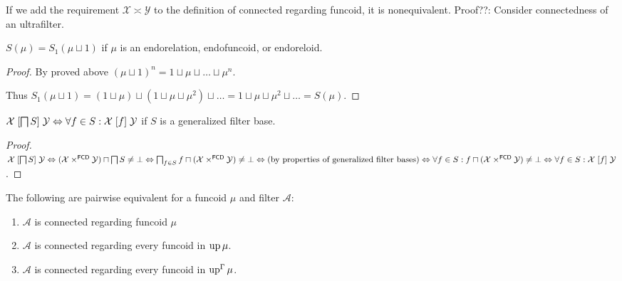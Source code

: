 If we add the requirement $\mathcal{X} \asymp \mathcal{Y}$ to the definition
of connected regarding funcoid, it is nonequivalent. Proof??: Consider
connectedness of an ultrafilter.

\begin{prop}
  $S (\mu) = S_1 (\mu \sqcup 1)$ if $\mu$ is an endorelation, endofuncoid, or
  endoreloid. 
\end{prop}

\begin{proof}
  By proved above $(\mu \sqcup 1)^n = 1 \sqcup \mu \sqcup \ldots \sqcup
  \mu^n$.

  Thus $S_1 (\mu \sqcup 1) = (1 \sqcup \mu) \sqcup (1 \sqcup \mu \sqcup \mu^2)
  \sqcup \ldots = 1 \sqcup \mu \sqcup \mu^2 \sqcup \ldots = S (\mu)$.
\end{proof}


\begin{thm}
  $\mathcal{X} \mathrel{\left[ \bigsqcap S \right]} \mathcal{Y}
  \Leftrightarrow \forall f \in S : \mathcal{X} \mathrel{\left[f\right]} \mathcal{Y}$ if
  $S$ is a generalized filter base.
\end{thm}

\begin{proof}
  $\mathcal{X} \mathrel{\left[ \bigsqcap S \right]} \mathcal{Y}
  \Leftrightarrow (\mathcal{X} \times^{\mathsf{FCD}} \mathcal{Y})
  \sqcap \bigsqcap S \neq \bot \Leftrightarrow \bigsqcap_{f \in S} f \sqcap
  (\mathcal{X} \times^{\mathsf{FCD}} \mathcal{Y}) \neq \bot
  \Leftrightarrow \text{(by properties of generalized filter bases)}
  \Leftrightarrow \forall f \in S : f \sqcap (\mathcal{X}
  \times^{\mathsf{FCD}} \mathcal{Y}) \neq \bot \Leftrightarrow \forall
  f \in S : \mathcal{X} \mathrel{\left[f\right]} \mathcal{Y}$.
\end{proof}

\begin{thm}
  The following are pairwise equivalent for a funcoid $\mu$ and filter
  $\mathcal{A}$:
  \begin{enumerate}
    \item $\mathcal{A}$ is connected regarding funcoid $\mu$

    \item $\mathcal{A}$ is connected regarding every funcoid in $\operatorname{up}
    \mu$.

    \item $\mathcal{A}$ is connected regarding every funcoid in
    $\operatorname{up}^{\Gamma} \mu$.
  \end{enumerate}
\end{thm}

